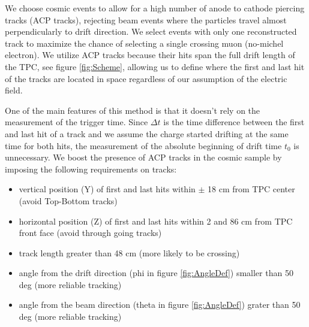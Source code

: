 We choose cosmic events to allow for a high number of anode to cathode piercing tracks (ACP tracks), rejecting  beam  events where the particles travel almost perpendicularly to drift direction. We select events with only one reconstructed track to  maximize the chance of selecting a single crossing muon (no-michel electron). We utilize ACP tracks because their hits span the full drift length of the TPC, see figure \ref{fig:Scheme}, allowing us to define where the first and last hit of the tracks are located in space regardless of our assumption of the electric field. %


One of the main features of this method is that it doesn't rely on the measurement of the trigger time. Since $\Delta t$ is the time difference between the first and last hit of a track and we assume the charge started drifting at the same time for both hits, the measurement of the absolute beginning of drift time $t_0$ is unnecessary. We boost the presence of ACP tracks in the cosmic sample by imposing the following requirements on tracks:

\begin{itemize}
\item vertical position (Y) of first and last hits within $\pm$ 18 cm from TPC center (avoid Top-Bottom tracks) 
\item horizontal position (Z) of first and last hits within 2 and 86 cm from TPC front face (avoid through going tracks) 
\item track length greater than 48 cm (more likely to be crossing)
\item angle from the drift direction (phi in figure \ref{fig:AngleDef}) smaller than 50 deg (more reliable tracking)
\item angle from the beam direction (theta in figure \ref{fig:AngleDef}) grater than 50 deg (more reliable tracking)
\end{itemize}


